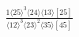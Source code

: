 \documentclass[varwidth, border=5pt]{standalone}
\begin{document}
\begin{my}
$\begin{gathered}
\scriptscriptstyle\frac{1⟨25⟩^3⟨24⟩⟨13⟩[25]}{⟨12⟩^3⟨23⟩^2⟨35⟩[45]}
\end{gathered}$
\end{my}
\end{document}
